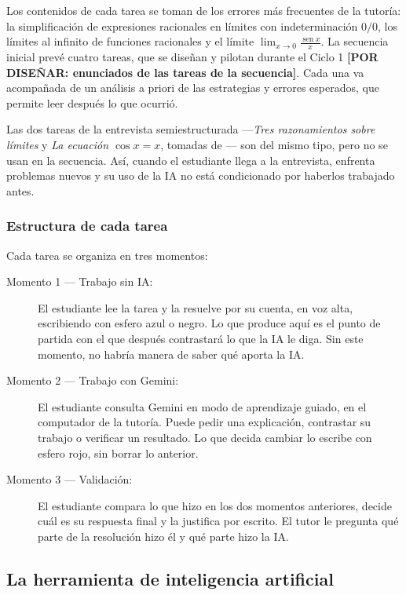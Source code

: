 Los contenidos de cada tarea se toman de los errores más frecuentes de la tutoría: la simplificación de expresiones racionales en límites con indeterminación $0/0$, los límites al infinito de funciones racionales y el límite $\lim_{x\to0}\frac{\operatorname{sen}x}{x}$. La secuencia inicial prevé cuatro tareas, que se diseñan y pilotan durante el Ciclo 1 \textbf{[POR DISEÑAR: enunciados de las tareas de la secuencia]}. Cada una va acompañada de un análisis a priori de las estrategias y errores esperados, que permite leer después lo que ocurrió.

Las dos tareas de la entrevista semiestructurada ---\emph{Tres razonamientos sobre límites} y \emph{La ecuación $\cos x = x$}, tomadas de \textcite{vandebrouck2021task}--- son del mismo tipo, pero no se usan en la secuencia. Así, cuando el estudiante llega a la entrevista, enfrenta problemas nuevos y su uso de la IA no está condicionado por haberlos trabajado antes.

\subsubsection{Estructura de cada tarea}

Cada tarea se organiza en tres momentos:

\begin{description}
\item[Momento 1 --- Trabajo sin IA:] El estudiante lee la tarea y la resuelve por su cuenta, en voz alta, escribiendo con esfero azul o negro. Lo que produce aquí es el punto de partida con el que después contrastará lo que la IA le diga. Sin este momento, no habría manera de saber qué aporta la IA.

\item[Momento 2 --- Trabajo con Gemini:] El estudiante consulta Gemini en modo de aprendizaje guiado, en el computador de la tutoría. Puede pedir una explicación, contrastar su trabajo o verificar un resultado. Lo que decida cambiar lo escribe con esfero rojo, sin borrar lo anterior.

\item[Momento 3 --- Validación:] El estudiante compara lo que hizo en los dos momentos anteriores, decide cuál es su respuesta final y la justifica por escrito. El tutor le pregunta qué parte de la resolución hizo él y qué parte hizo la IA.
\end{description}

\subsection{La herramienta de inteligencia artificial}

